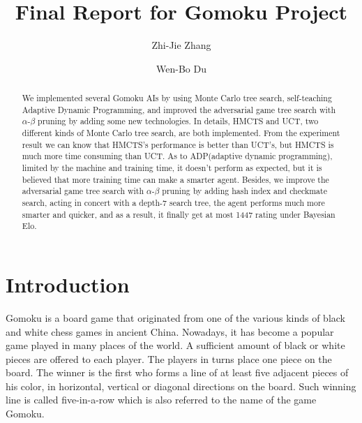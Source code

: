 \documentclass[sigconf, nonacm]{acmart}
\begin{document}
\title{Final Report for Gomoku Project}

\author{Zhi-Jie Zhang}
\affiliation{
}

\author{Wen-Bo Du}
\affiliation{
}


\begin{abstract}
%
\quad We implemented several Gomoku AIs by using Monte Carlo tree search, self-teaching Adaptive Dynamic Programming, and improved the adversarial game tree search with $\alpha$-$\beta$ pruning by adding some new technologies. 
%
In details, HMCTS and UCT, two different kinds of Monte Carlo tree search, are both implemented. From the experiment result we can know that HMCTS's performance is better than UCT's, but HMCTS is much more time consuming than UCT. 
%
As to ADP(adaptive dynamic programming), limited by the machine and training time, it doesn't perform as expected, but it is believed that more training time can make a smarter agent.
%
Besides, we improve the adversarial game tree search with $\alpha$-$\beta$ pruning by adding hash index and checkmate search, acting in concert with a depth-7 search tree, the agent performs much more smarter and quicker, and as a result, it finally get at most 1447 rating under Bayesian Elo.

\end{abstract}

\maketitle


\section{Introduction}

\quad Gomoku is a board game that originated from one of the
various kinds of black and white chess games in ancient China.
%
Nowadays, it has become a popular game played in many places
of the world. A sufficient amount of black or white pieces are
offered to each player. 
%
The players in turns place one piece on the
board. 
%
The winner is the first who forms a line of at least five
adjacent pieces of his color, in horizontal, vertical or diagonal
directions on the board. 
%
Such winning line is called five-in-a-row
which is also referred to the name of the game Gomoku.  
\end{document}
